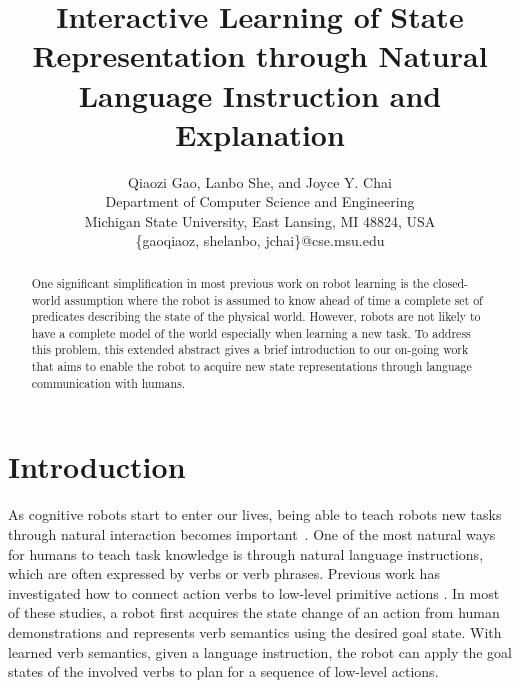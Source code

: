 \documentclass[letterpaper]{article} %
\begin{document}
%
\title{Interactive Learning of State Representation through Natural Language Instruction and Explanation}
\author{Qiaozi Gao, Lanbo She, and Joyce Y. Chai\\
Department of Computer Science and Engineering\\
Michigan State University, East Lansing, MI 48824, USA\\
\{gaoqiaoz, shelanbo, jchai\}@cse.msu.edu\\
}
\maketitle

\begin{abstract}
One significant simplification in most previous work on robot learning is the closed-world assumption where the robot is assumed to know ahead of time a complete set of predicates describing the state of the physical world. However, robots are not likely to have a complete model of the world especially when learning a new task. To address this problem, this extended abstract gives a brief introduction to our on-going work that aims to enable the robot to acquire new state representations through language communication with humans.
\end{abstract}

\section{Introduction}
As cognitive robots start to enter our lives, being able to teach robots new tasks through natural interaction becomes important~\cite{matuszek2012joint,liu16a,liu16b,chai2017}. One of the most natural ways for humans to teach task knowledge is through natural language instructions, which are often expressed by verbs or verb phrases. Previous work has investigated how to connect action verbs to low-level primitive actions \cite{branavan2009reinforcement,mohan2014learning,she14sigdial,misra2015environment,misra2016tell,she2016incremental,she2017interactive}. In most of these studies, a robot first acquires the state change of an action from human demonstrations and represents verb semantics using the desired goal state. With learned verb semantics, given a language instruction, the robot can apply the goal states of the involved verbs to plan for a sequence of low-level actions.
\end{document}
